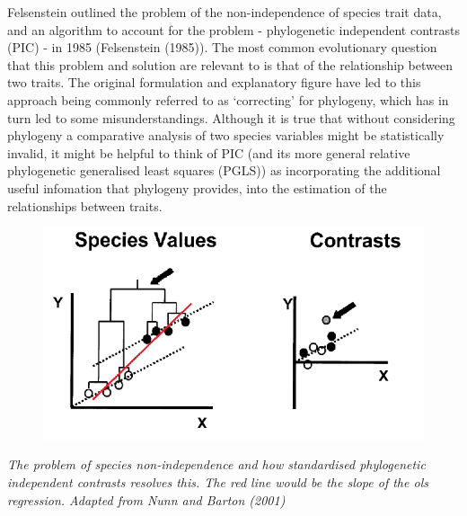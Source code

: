 \documentclass[]{article}
\begin{document}
Felsenstein outlined the problem of the non-independence of species
trait data, and an algorithm to account for the problem - phylogenetic
independent contrasts (PIC) - in 1985 (Felsenstein (1985)). The most
common evolutionary question that this problem and solution are relevant
to is that of the relationship between two traits. The original
formulation and explanatory figure have led to this approach being
commonly referred to as `correcting' for phylogeny, which has in turn
led to some misunderstandings. Although it is true that without
considering phylogeny a comparative analysis of two species variables
might be statistically invalid, it might be helpful to think of PIC (and
its more general relative phylogenetic generalised least squares (PGLS))
as incorporating the additional useful infomation that phylogeny
provides, into the estimation of the relationships between traits.

\begin{figure}
\centering
\includegraphics{contrasts.png}
\caption{}
\end{figure}

\emph{The problem of species non-independence and how standardised
phylogenetic independent contrasts resolves this. The red line would be
the slope of the ols regression. Adapted from Nunn and Barton (2001) }
\end{document}

